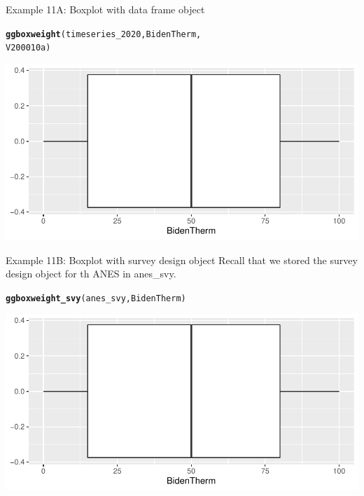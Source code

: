 \documentclass{beamer}\usepackage[]{graphicx}\usepackage[]{color}
\makeatletter
\newcommand{\hlstd}[1]{\textcolor[rgb]{0.345,0.345,0.345}{#1}}%
\newcommand{\hlkwd}[1]{\textcolor[rgb]{0.737,0.353,0.396}{\textbf{#1}}}%
\newenvironment{kframe}{%
 \def\at@end@of@kframe{}%
 \ifinner\ifhmode%
  \def\at@end@of@kframe{\end{minipage}}%
  \begin{minipage}{\columnwidth}%
 \fi\fi%
 \def\FrameCommand##1{\hskip\@totalleftmargin \hskip-\fboxsep
 \colorbox{shadecolor}{##1}\hskip-\fboxsep
     \hskip-\linewidth \hskip-\@totalleftmargin \hskip\columnwidth}%
 \MakeFramed {\advance\hsize-\width
   \@totalleftmargin\z@ \linewidth\hsize
   \@setminipage}}%
 {\par\unskip\endMakeFramed%
 \at@end@of@kframe}
\newenvironment{knitrout}{}{} %
\makeatother
\begin{document}
\begin{frame}[fragile]{Example 11A: Boxplot with data frame object}
\begin{knitrout}
\color{fgcolor}\begin{kframe}
\begin{alltt}
\hlkwd{ggboxweight}\hlstd{(timeseries_2020, BidenTherm,}
    \hlstd{V200010a)}
\end{alltt}
\end{kframe}
\includegraphics[width=0.95\linewidth]{figure/unnamed-chunk-45-1} 
\end{knitrout}

\end{frame}

\begin{frame}[fragile]{Example 11B: Boxplot with survey design object}
Recall that we stored the survey design object for th ANES in anes\_svy.
\begin{knitrout}
\color{fgcolor}\begin{kframe}
\begin{alltt}
\hlkwd{ggboxweight_svy}\hlstd{(anes_svy, BidenTherm)}
\end{alltt}
\end{kframe}
\includegraphics[width=0.95\linewidth]{figure/unnamed-chunk-46-1} 
\end{knitrout}

\end{frame}
\end{document}
